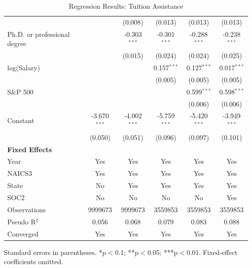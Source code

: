 \begin{table}[!htbp]
\begin{tabular}{lccccc}
 &  & (0.008) & (0.013) & (0.013) & (0.013) \\
Ph.D. or professional degree &  & -0.303$^{***}$ & -0.301$^{***}$ & -0.288$^{***}$ & -0.238$^{***}$ \\
 &  & (0.015) & (0.024) & (0.024) & (0.025) \\
log(Salary) &  &  & 0.157$^{***}$ & 0.127$^{***}$ & 0.017$^{***}$ \\
 &  &  & (0.005) & (0.005) & (0.005) \\
S\&P 500 &  &  &  & 0.599$^{***}$ & 0.598$^{***}$ \\
 &  &  &  & (0.006) & (0.006) \\
Constant & -3.670$^{***}$ & -4.002$^{***}$ & -5.759$^{***}$ & -5.420$^{***}$ & -3.949$^{***}$ \\
 & (0.050) & (0.051) & (0.096) & (0.097) & (0.101) \\
\midrule
\textbf{Fixed Effects} &  &  &  &  &  \\
Year & Yes & Yes & Yes & Yes & Yes \\
NAICS3 & Yes & Yes & Yes & Yes & Yes \\
State & No & Yes & Yes & Yes & Yes \\
SOC2 & No & No & No & No & Yes \\
Observations & 9999673 & 9999673 & 3559853 & 3559853 & 3559853 \\
Pseudo R$^2$ & 0.056 & 0.068 & 0.079 & 0.083 & 0.088 \\
Converged & Yes & Yes & Yes & Yes & Yes \\
\bottomrule
\end{tabular}
\caption{Regression Results: Tuition Assistance}
\par\smallskip\scriptsize Standard errors in parentheses. *p$<$0.1; **p$<$0.05; ***p$<$0.01. Fixed-effect coefficients omitted.
\end{table}